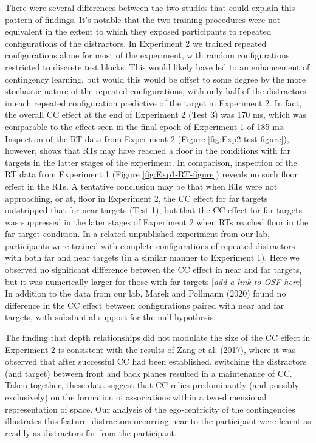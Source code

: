\documentclass[
  english,
  man,floatsintext]{apa7}
\begin{document}
There were several differences between the two studies that could explain this pattern of findings. It's notable that the two training procedures were not equivalent in the extent to which they exposed participants to repeated configurations of the distractors. In Experiment 2 we trained repeated configurations alone for most of the experiment, with random configurations restricted to discrete test blocks. This would likely have led to an enhancement of contingency learning, but would this would be offset to some degree by the more stochastic nature of the repeated configurations, with only half of the distractors in each repeated configuration predictive of the target in Experiment 2. In fact, the overall CC effect at the end of Experiment 2 (Test 3) was 170 ms, which was comparable to the effect seen in the final epoch of Experiment 1 of 185 ms. Inspection of the RT data from Experiment 2 (Figure \ref{fig:Exp2-test-figure}), however, shows that RTs may have reached a floor in the conditions with far targets in the latter stages of the experiment. In comparison, inspection of the RT data from Experiment 1 (Figure \ref{fig:Exp1-RT-figure}) reveals no such floor effect in the RTs. A tentative conclusion may be that when RTs were not approaching, or at, floor in Experiment 2, the CC effect for far targets outstripped that for near targets (Test 1), but that the CC effect for far targets was suppressed in the later stages of Experiment 2 when RTs reached floor in the far target condition. In a related unpublished experiment from our lab, participants were trained with complete configurations of repeated distractors with both far and near targets (in a similar manner to Experiment 1). Here we observed no significant difference between the CC effect in near and far targets, but it was numerically larger for those with far targets {[}\emph{add a link to OSF here}{]}. In addition to the data from our lab, Marek and Pollmann (2020) found no difference in the CC effect between configurations paired with near and far targets, with substantial support for the null hypothesis.

The finding that depth relationships did not modulate the size of the CC effect in Experiment 2 is consistent with the results of Zang et al. (2017), where it was observed that after successful CC had been established, switching the distractors (and target) between front and back planes resulted in a maintenance of CC. Taken together, these data suggest that CC relies predominantly (and possibly exclusively) on the formation of associations within a two-dimensional representation of space. Our analysis of the ego-centricity of the contingencies illustrates this feature: distractors occurring near to the participant were learnt as readily as distractors far from the participant.
\end{document}
